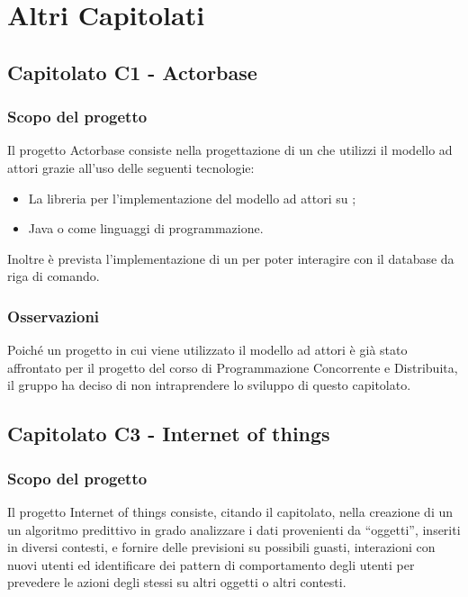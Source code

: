 \section{Altri Capitolati}

\subsection{Capitolato C1 - Actorbase}
\subsubsection{Scopo del progetto}

Il progetto Actorbase consiste nella progettazione di un  che utilizzi il modello ad attori grazie all'uso delle seguenti tecnologie:
\begin{itemize}
	\item La libreria  per l'implementazione del modello ad attori su ;
	\item Java o  come linguaggi di programmazione.
\end{itemize}
Inoltre è prevista l'implementazione di un  per poter interagire con il database da riga di comando.

\subsubsection{Osservazioni}
Poiché un progetto in cui viene utilizzato il modello ad attori è già stato affrontato per il progetto del corso di Programmazione Concorrente e Distribuita, il gruppo ha deciso di
non intraprendere lo sviluppo di questo capitolato.


\subsection{Capitolato C3 - Internet of things}
\subsubsection{Scopo del progetto}

Il progetto Internet of things consiste, citando il capitolato, nella creazione di un un algoritmo predittivo in grado analizzare i dati provenienti da “oggetti”, inseriti
in diversi contesti, e fornire delle previsioni su possibili guasti, interazioni con nuovi utenti ed identificare dei pattern di comportamento degli utenti per prevedere le azioni degli
stessi su altri oggetti o altri contesti.

